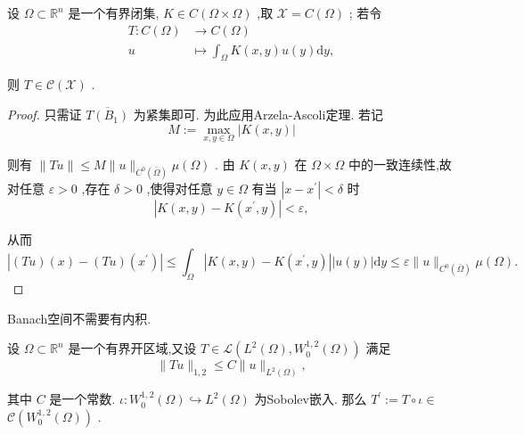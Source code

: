 \documentclass[lang=cn,newtx,10pt,scheme=chinese,thmcnt=chapter]{elegantbook}
\newcommand{\dif}{\mathrm{d}}
\begin{document}
\begin{example}
     设 \(\Omega  \subset  {\mathbb{R}}^{n}\) 是一个有界闭集, \(K \in  C\left( {\Omega  \times  \Omega }\right)\) ,取 \(\mathcal{X} = C\left( \Omega \right)\) ; 若令
\begin{equation*}
\begin{aligned} T : C\left( \Omega \right) &  \rightarrow  C\left( \Omega \right) \\  u &  \mapsto  {\int }_{\Omega }K\left( {x,y}\right) u\left( y\right) {\dif y}, \end{aligned}
\end{equation*}

则 \(T \in  \mathcal{C}\left( \mathcal{X}\right)\) .

\end{example}
\begin{proof}
    只需证 \(\overline{T\left( {B}_{1}\right) }\) 为紧集即可. 为此应用Arzela-Ascoli定理. 若记
\begin{equation*}
M \mathrel{\text{ := }} \mathop{\max }\limits_{{x,y \in  \Omega }}\left| {K\left( {x,y}\right) }\right|
\end{equation*}

则有 \(\parallel {Tu}\parallel  \leqslant  M\parallel u{\parallel }_{{C}^{0}\left( \bar{\Omega }\right) }\mu \left( \Omega \right)\) . 由 \(K\left( {x,y}\right)\) 在 \(\Omega  \times  \Omega\) 中的一致连续性,故对任意 \(\varepsilon  > 0\) ,存在 \(\delta  > 0\) ,使得对任意 \(y \in  \Omega\) 有当 \(\left| {x - {x}^{\prime }}\right|  < \delta\) 时
\begin{equation*}
\left| {K\left( {x,y}\right)  - K\left( {{x}^{\prime },y}\right) }\right|  < \varepsilon ,
\end{equation*}

从而
\begin{equation*}
\left| {\left( {Tu}\right) \left( x\right)  - \left( {Tu}\right) \left( {x}^{\prime }\right) }\right|  \leqslant  {\int }_{\Omega }\left| {K\left( {x,y}\right)  - K\left( {{x}^{\prime },y}\right) }\right| \left| {u\left( y\right) }\right| {\dif y} \leqslant  \varepsilon \parallel u{\parallel }_{{C}^{0}\left( \bar{\Omega }\right) }\mu \left( \Omega \right) .
\end{equation*}
\end{proof}
\begin{note}
Banach空间不需要有内积.
\end{note}
\begin{example}
    设 \(\Omega  \subset  {\mathbb{R}}^{n}\) 是一个有界开区域,又设 \(T \in  \mathcal{L}\left( {{L}^{2}\left( \Omega \right) ,{W}_{0}^{1,2}\left( \Omega \right) }\right)\) 满足
\begin{equation*}
\parallel {Tu}{\parallel }_{1,2} \leqslant  C\parallel u{\parallel }_{{L}^{2}\left( \Omega \right) },
\end{equation*}

其中 \(C\) 是一个常数. \(\iota  : {W}_{0}^{1,2}\left( \Omega \right)  \hookrightarrow  {L}^{2}\left( \Omega \right)\) 为Sobolev嵌入. 那么 \({T}^{\prime } \mathrel{\text{ := }} T \circ  \iota  \in\)  \(\mathcal{C}\left( {{W}_{0}^{1,2}\left( \Omega \right) }\right)\) .

\end{example}
\end{document}
